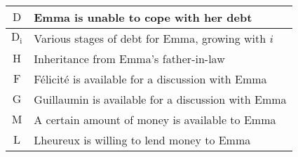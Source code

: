 \begin{footnotesize}
\begin{tabular}{|c|p{}|}
\hline
$\mathrm{D}$   & Emma is unable to cope with her debt\\ \hline
$\mathrm{D_i}$ & Various stages of debt for Emma, growing with $i$\\ \hline
$\mathrm{H}$   & Inheritance from Emma's father-in-law\\ \hline
$\mathrm{F}$   & F\'elicit\'e  is available for a discussion with Emma\\ \hline
$\mathrm{G}$   & Guillaumin  is available for a discussion with Emma\\ \hline
$\mathrm{M}$   & A certain amount of money is available to Emma\\ \hline
$\mathrm{L}$   & Lheureux is willing to lend money to Emma\\
\hline
\end{tabular}
\end{footnotesize} 